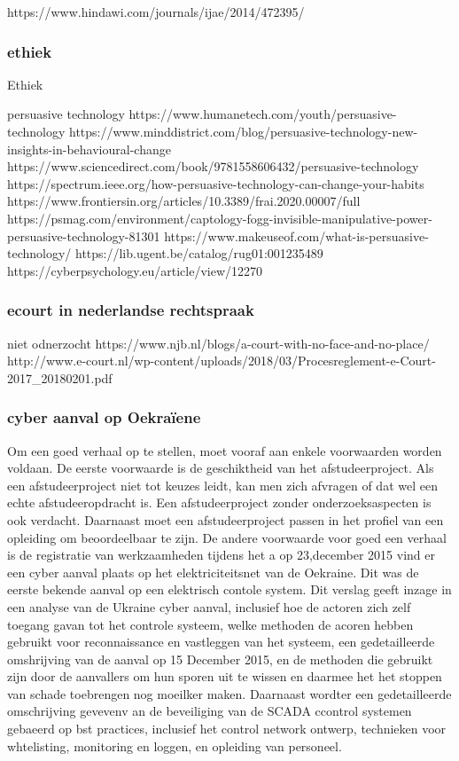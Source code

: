 https://www.hindawi.com/journals/ijae/2014/472395/ 


\subsubsection{ethiek}


Ethiek 



persuasive technology 
https://www.humanetech.com/youth/persuasive-technology 
https://www.minddistrict.com/blog/persuasive-technology-new-insights-in-behavioural-change 
https://www.sciencedirect.com/book/9781558606432/persuasive-technology 
https://spectrum.ieee.org/how-persuasive-technology-can-change-your-habits 
https://www.frontiersin.org/articles/10.3389/frai.2020.00007/full 
https://psmag.com/environment/captology-fogg-invisible-manipulative-power-persuasive-technology-81301 
https://www.makeuseof.com/what-is-persuasive-technology/ 
https://lib.ugent.be/catalog/rug01:001235489 
https://cyberpsychology.eu/article/view/12270 



\subsubsection{ecourt in nederlandse rechtspraak}
niet odnerzocht
https://www.njb.nl/blogs/a-court-with-no-face-and-no-place/ 
http://www.e-court.nl/wp-content/uploads/2018/03/Procesreglement-e-Court-2017_20180201.pdf

\subsubsection{ cyber aanval op Oekraïene }
Om een goed verhaal op te stellen, moet vooraf aan enkele voorwaarden
worden voldaan. De eerste voorwaarde is de geschiktheid van het
afstudeerproject. Als een afstudeerproject niet tot keuzes leidt, kan
men zich afvragen of dat wel een echte afstudeeropdracht is. Een
afstudeerproject zonder onderzoeksaspecten is ook verdacht. Daarnaast
moet een afstudeerproject passen in het profiel van een opleiding om
beoordeelbaar te zijn. De andere voorwaarde voor goed een verhaal is
de registratie van werkzaamheden tijdens het a
op 23,december 2015  vind er een cyber aanval plaats op het elektriciteitsnet van de Oekraine. Dit was de eerste bekende aanval op een elektrisch contole  system.  Dit verslag geeft inzage in een analyse van de Ukraine cyber aanval,
inclusief hoe de actoren zich zelf toegang gavan tot het controle systeem, welke methoden de acoren hebben gebruikt voor reconnaissance en vastleggen van het systeem, een gedetailleerde omshrijving van de aanval op 15 December 2015, en de methoden die gebruikt zijn door de aanvallers om hun sporen uit te wissen en daarmee het het stoppen van schade toebrengen  nog moeilker maken. Daarnaast wordter  een gedetailleerde omschrijving gevevenv an de beveiliging van de SCADA ccontrol systemen gebaeerd op bst practices, inclusief het control network ontwerp, technieken voor whtelisting, monitoring en loggen, en  opleiding van personeel.
\cite{Whitehead2017ukrainepoweroutage}

